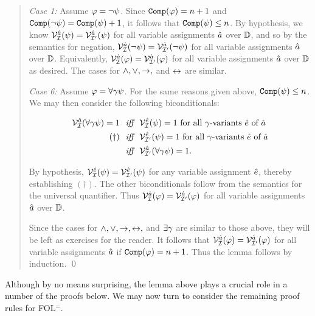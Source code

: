 \begin{quote}
  \textit{Case 1:} Assume $\varphi=\neg\psi$.
  Since $\texttt{Comp}(\varphi)=n+1$ and $\texttt{Comp}(\neg\psi)=\texttt{Comp}(\psi)+1$, it follows that $\texttt{Comp}(\psi)\leq n$.
  By hypothesis, we know $\mathcal{V}_{\mathcal{I}}^{\hat{a}}(\psi)=\mathcal{V}_{\mathcal{I}'}^{\hat{a}}(\psi)$ for all variable assignments $\hat{a}$ over $\mathbb{D}$, and so by the semantics for negation, $\mathcal{V}_{\mathcal{I}}^{\hat{a}}(\neg\psi)=\mathcal{V}_{\mathcal{I}'}^{\hat{a}}(\neg\psi)$ for all variable assignments $\hat{a}$ over $\mathbb{D}$.
  Equivalently, $\mathcal{V}_{\mathcal{I}}^{\hat{a}}(\varphi)=\mathcal{V}_{\mathcal{I}'}^{\hat{a}}(\varphi)$ for all variable assignments $\hat{a}$ over $\mathbb{D}$ as desired. 
  The cases for $\wedge,\vee,\rightarrow,$ and $\leftrightarrow$ are similar.

  \textit{Case 6:} Assume $\varphi=\forall \gamma\psi$.
  For the same reasons given above, $\texttt{Comp}(\psi)\leq n$.
  We may then consider the following biconditionals:

  \vspace{-.2in}
  \begin{align*}
    \mathcal{V}_{\mathcal{I}}^{\hat{a}}(\forall \gamma\psi)=1 &\textit{ ~iff~ } \mathcal{V}_{\mathcal{I}}^{\hat{e}}(\psi)=1 \text{ for all } \gamma\text{-variants } \hat{e} \text{ of } \hat{a}\\ 
      (\dagger) &\textit{ ~iff~ } \mathcal{V}_{\mathcal{I}'}^{\hat{e}}(\psi)=1 \text{ for all } \gamma\text{-variants } \hat{e} \text{ of } \hat{a}\\  
      &\textit{ ~iff~ } \mathcal{V}_{\mathcal{I}'}^{\hat{a}}(\forall \gamma\psi)=1.
  \end{align*}

  By hypothesis, $\mathcal{V}_{\mathcal{I}}^{\hat{e}}(\psi)=\mathcal{V}_{\mathcal{I}'}^{\hat{e}}(\psi)$ for any variable assignment $\hat{e}$, thereby establishing $(\dagger)$.
  The other biconditionals follow from the semantics for the universal quantifier.
  Thus $\mathcal{V}_{\mathcal{I}}^{\hat{a}}(\varphi)=\mathcal{V}_{\mathcal{I}'}^{\hat{a}}(\varphi)$ for all variable assignments $\hat{a}$ over $\mathbb{D}$. 

  Since the cases for $\wedge,\vee,\rightarrow,\leftrightarrow,$ and $\exists \gamma$ are similar to those above, they will be left as exercises for the reader.
  It follows that $\mathcal{V}_{\mathcal{I}}^{\hat{a}}(\varphi)=\mathcal{V}_{\mathcal{I}'}^{\hat{a}}(\varphi)$ for all variable assignments $\hat{a}$ if $\texttt{Comp}(\varphi)=n+1$.
  Thus the lemma follows by induction.
  \qed
\end{quote}

Although by no means surprising, the lemma above plays a crucial role in a number of the proofs below.
We may now turn to consider the remaining proof rules for FOL$^=$.





